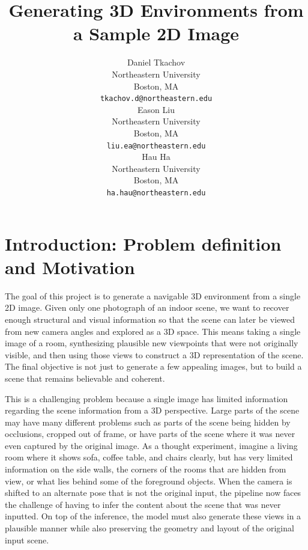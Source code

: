\documentclass{article}
\title{Generating 3D Environments from a Sample 2D Image}
\author{
  Daniel Tkachov \\
  Northeastern University \\
  Boston, MA \\
  \texttt{tkachov.d@northeastern.edu} \\
  \And
  Eason Liu \\
  Northeastern University \\
  Boston, MA \\
  \texttt{liu.ea@northeastern.edu} \\
  \And
  Hau Ha \\
  Northeastern University \\
  Boston, MA \\
  \texttt{ha.hau@northeastern.edu} \\
}
\begin{document}
\linenumbers


\maketitle





\section{Introduction: Problem definition and Motivation}
The goal of this project is to generate a navigable 3D environment from a single 2D image. Given only one photograph of an indoor scene, we want to recover enough structural and visual information so that the scene can later be viewed from new camera angles and explored as a 3D space. This means taking a single image of a room, synthesizing plausible new viewpoints that were not originally visible, and then using those views to construct a 3D representation of the scene. The final objective is not just to generate a few appealing images, but to build a scene that remains believable and coherent. %

This is a challenging problem because a single image has limited information regarding the scene information from a 3D perspective. Large parts of the scene may have many different problems such as parts of the scene being hidden by occlusions, cropped out of frame, or have parts of the scene where it was never even captured by the original image. As a thought experiment, imagine a living room where it shows sofa, coffee table, and chairs clearly, but has very limited information on the side walls, the corners of the rooms that are hidden from view, or what lies behind some of the foreground objects. When the camera is shifted to an alternate pose that is not the original input, the pipeline now faces the challenge of having to infer the content about the scene that was never inputted. On top of the inference, the model must also generate these views in a plausible manner while also preserving the geometry and layout of the original input scene.
\end{document}
